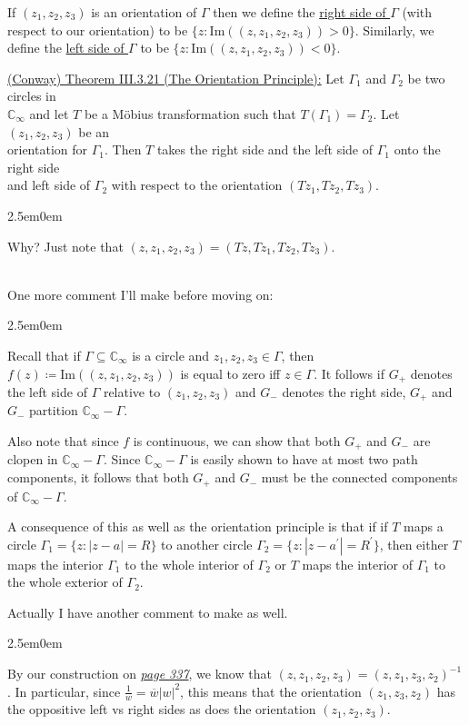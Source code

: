 \documentclass{book}
\newcommand{\inLinkRap}[2]{{\color{blue}\hyperlink{#1}{\textit{#2}}}}
\newcommand{\pracOne}{
   \color{BrickRed}%
   \fontsize{13}{15}\selectfont%
}
\newcommand{\exTwo}{%
   \color{Purple}%
   \fontsize{13}{15}\selectfont%
}
\newcommand{\exThreeP}{%
   \color{RedViolet}%
   \fontsize{12}{14}\selectfont%
}
\newenvironment{myIndent}{%
   \begin{adjustwidth}{2.5em}{0em}%
}{%
   \end{adjustwidth}%
}
\newcommand{\udefine}[1]{{%
   \setulcolor{Red}%
   \setul{0.14em}{0.07em}%
   \ul{#1}%
}}
\newcommand{\ima}[1]{\mathrm{Im}(#1)}
\newcommand{\mySepTwo}[1][.]{%
   {\noindent\color{#1}{\rule{6.5in}{0.5mm}}}\\%
}
\newcommand{\retTwo}{\hfill\bigbreak}
\begin{document}
If $(z_1, z_2, z_3)$ is an orientation of $\Gamma$ then we define the \udefine{right side of $\Gamma$} (with respect to our orientation) to be $\{z : \ima{(z, z_1, z_2, z_3)} > 0\}$. Similarly, we define the \udefine{left side of $\Gamma$} to be $\{z : \ima{(z, z_1, z_2, z_3)} < 0\}$.\retTwo

\exTwo\ul{(Conway) Theorem III.3.21 (The Orientation Principle):} Let $\Gamma_1$ and $\Gamma_2$ be two circles in\\ $\mathbb{C}_\infty$ and let $T$ be a Möbius transformation such that $T(\Gamma_1) = \Gamma_2$. Let $(z_1, z_2, z_3)$ be an\\ orientation for $\Gamma_1$. Then $T$ takes the right side and the left side of $\Gamma_1$ onto the right side\\ and left side of $\Gamma_2$ with respect to the orientation $(Tz_1, Tz_2, Tz_3)$.
\begin{myIndent}\exThreeP
	Why? Just note that $(z, z_1, z_2, z_3) = (Tz, Tz_1, Tz_2, Tz_3)$.\retTwo
\end{myIndent}

\pracOne\mySepTwo

One more comment I'll make before moving on:
\begin{myIndent}
	Recall that if $\Gamma \subseteq \mathbb{C}_\infty$ is a circle and $z_1, z_2, z_3 \in \Gamma$, then $f(z) \coloneqq \ima{(z, z_1, z_2, z_3)}$ is equal to zero iff $z \in \Gamma$. It follows if $G_+$ denotes the left side of $\Gamma$ relative to $(z_1, z_2, z_3)$ and $G_-$ denotes the right side, $G_+$ and $G_-$ partition $\mathbb{C}_\infty - \Gamma$.\retTwo

	Also note that since $f$ is continuous, we can show that both $G_+$ and $G_-$ are clopen in $\mathbb{C}_\infty - \Gamma$. Since $\mathbb{C}_\infty - \Gamma$ is easily shown to have at most two path components, it follows that both $G_+$ and $G_-$ must be the connected components of $\mathbb{C}_\infty - \Gamma$.\retTwo

	A consequence of this as well as the orientation principle is that if if $T$ maps a circle $\Gamma_1 = \{z : |z - a| = R\}$ to another circle $\Gamma_2 = \{z : |z - a^\prime| = R^\prime\}$, then either $T$ maps the interior $\Gamma_1$ to the whole interior of $\Gamma_2$ or $T$ maps the interior of $\Gamma_1$ to the whole exterior of $\Gamma_2$.\retTwo
\end{myIndent}

Actually I have another comment to make as well.
\begin{myIndent}
	By our construction on \inLinkRap{page 337 reference}{page 337}, we know that $(z, z_1, z_2, z_3) = (z, z_1, z_3, z_2)^{-1}$. In particular, since $\frac{1}{w} = \overline{w}{|w|^2}$, this means that the orientation $(z_1, z_3, z_2)$ has the oppositive left vs right sides as does the orientation $(z_1, z_2, z_3)$.\retTwo
\end{myIndent}
\end{document}
